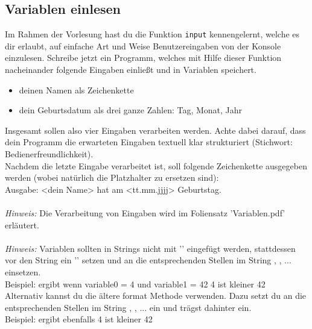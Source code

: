 \subsection{Variablen einlesen}
Im Rahmen der Vorlesung hast du die Funktion \texttt{input} kennengelernt, welche es dir erlaubt, auf einfache Art und Weise Benutzereingaben von der Konsole einzulesen. Schreibe jetzt ein Programm, welches mit Hilfe dieser Funktion nacheinander folgende Eingaben einließt und in Variablen speichert. 
\begin{itemize}
	\item deinen Namen als Zeichenkette
	\item dein Geburtsdatum als drei ganze Zahlen: Tag, Monat, Jahr
\end{itemize}
Insgesamt sollen also vier Eingaben verarbeiten werden. Achte dabei darauf, dass dein Programm die erwarteten Eingaben textuell klar strukturiert (Stichwort: Bedienerfreundlichkeit).\\
Nachdem die letzte Eingabe verarbeitet ist, soll folgende Zeichenkette ausgegeben werden (wobei natürlich die Platzhalter zu ersetzen sind):\\
Ausgabe: {\ttfamily{\dq}}<dein Name> hat am <tt.mm.jjjj> Geburtstag.{\ttfamily{\dq}}\\
\\
\textit{Hinweis:} Die Verarbeitung von Eingaben wird im Foliensatz 'Variablen.pdf' erläutert.\\
\\
\textit{Hinweis:} Variablen sollten in Strings nicht mit '\pythoninline{+}' eingefügt werden, stattdessen vor den String ein '' setzen und an die entsprechenden Stellen im String , , ... einsetzen. \\
Beispiel:  ergibt wenn variable0 = 4 und variable1 = 42 {\ttfamily{\dq}}4 ist kleiner 42{\ttfamily{\dq}}\\
Alternativ kannst du die ältere format Methode verwenden. Dazu setzt du an die entsprechenden Stellen im String , , ... ein und trägst dahinter  ein.\\
Beispiel:  ergibt ebenfalls {\ttfamily{\dq}}4 ist kleiner 42{\ttfamily{\dq}}
